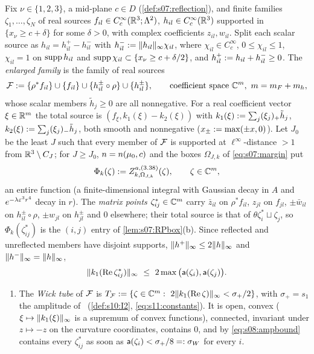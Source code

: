 \begin{definition}\label{def:s08:enlarged}
Fix $\nu\in\{1,2,3\}$, a mid-plane $c\in D$ (\cref{def:s07:reflection}), and finite families $\zeta_1,\dots,\zeta_N$ of real sources $f_{il}\in C^\infty_c(\mathbb R^3;\Lambda^2)$, $h_{il}\in C^\infty_c(\mathbb R^3)$ supported in $\{x_\nu\ge c+\delta\}$ for some $\delta>0$, with complex coefficients $z_{il},w_{il}$. Split each scalar source as $h_{il}=h^+_{il}-h^-_{il}$ with $h^-_{il}:=\lVert h_{il}\rVert_\infty\chi_{il}$, where $\chi_{il}\in C^\infty_c$, $0\le\chi_{il}\le1$, $\chi_{il}=1$ on $\operatorname{supp} h_{il}$ and $\operatorname{supp}\chi_{il}\subset\{x_\nu\ge c+\delta/2\}$, and $h^+_{il}:= h_{il}+h^-_{il}\ge0$. The \emph{enlarged family} is the family of real sources
\[
\mathcal F:=\{\rho^*f_{il}\}\cup\{f_{il}\}\cup\{h^\pm_{il}\circ\rho\}\cup\{h^\pm_{il}\},\qquad\text{coefficient space }\mathbb C^m,\ m=m_F+m_h ,
\]
whose scalar members $\tilde h_j\ge0$ are all nonnegative. For a real coefficient vector $\xi\in\mathbb R^m$ the total source is $(f_\xi,k_1(\xi)-k_2(\xi))$ with $k_1(\xi):=\sum_j(\xi_j)_+\tilde h_j$, $k_2(\xi):=\sum_j(\xi_j)_-\tilde h_j$, both smooth and nonnegative ($x_\pm:=\max(\pm x,0)$). Let $J_0$ be the least $J$ such that every member of $\mathcal F$ is supported at $\ell^\infty$-distance $>1$ from $\mathbb R^3\setminus C_J$; for $J\ge J_0$, $n=n(\mu_0,c)$ and the boxes $\Omega_{J,k}$ of \eqref{eq:s07:margin} put
\[
\Phi_k(\zeta):= Z^{a,(3.38)}_{k,\Omega_{J,k}}(\zeta),\qquad\zeta\in\mathbb C^m ,
\]
an entire function (a finite-dimensional integral with Gaussian decay in $A$ and $e^{-\lambda\varepsilon^3r^4}$ decay in $r$). The \emph{matrix points} $\zeta^*_{ij}\in\mathbb C^m$ carry $\bar z_{il}$ on $\rho^*f_{il}$, $z_{jl}$ on $f_{jl}$, $\pm\bar w_{il}$ on $h^\pm_{il}\circ\rho$, $\pm w_{jl}$ on $h^\pm_{jl}$ and $0$ elsewhere; their total source is that of $\theta\zeta_i^*\sqcup\zeta_j$, so $\Phi_k(\zeta^*_{ij})$ is the $(i,j)$ entry of \cref{lem:s07:RPbox}(b). Since reflected and unreflected members have disjoint supports, $\lVert h^+\rVert_\infty\le2\lVert h\rVert_\infty$ and $\lVert h^-\rVert_\infty=\lVert h\rVert_\infty$,
\begin{equation}\label{eq:s08:ampbound}
\norm{k_1(\Re\zeta^*_{ij})}_\infty\ \le\ 2\max\big(\amp(\zeta_i),\amp(\zeta_j)\big).
\end{equation}
\begin{enumerate}[label=\textup{(\roman*)},leftmargin=*,nosep]
\item The \emph{Wick tube} of $\mathcal F$ is $T_\cF\defeq\{\zeta\in\C^m:\ 2\norm{k_1(\Re\zeta)}_\infty<\sigma_+/2\}$, with $\sigma_+=s_1$ the amplitude of \Itwo\ (\cref{def:s10:I2}, \eqref{eq:s11:constants}). It is open, convex ($\xi\mapsto\lVert k_1(\xi)\rVert_\infty$ is a supremum of convex functions), connected, invariant under $z\mapsto-z$ on the curvature coordinates, contains $0$, and by \eqref{eq:s08:ampbound} contains every $\zeta^*_{ij}$ as soon as $\mathsf a(\zeta_i)<\sigma_+/8=:\sigma_W$ for every $i$.

\end{enumerate}
\end{definition}
